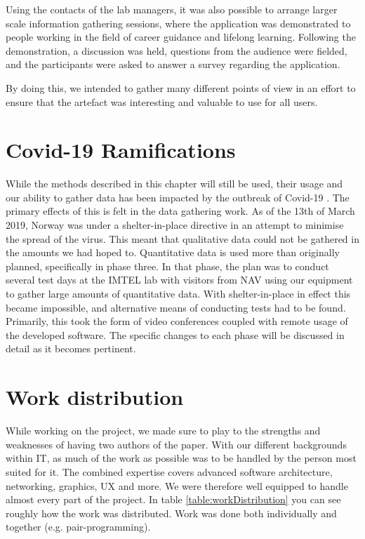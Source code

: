 Using the contacts of the lab managers, it was also possible to arrange larger scale information gathering sessions, where the application was demonstrated to people working in the field of career guidance and lifelong learning. Following the demonstration, a discussion was held, questions from the audience were fielded, and the participants were asked to answer a survey regarding the application. 

By doing this, we intended to gather many different points of view in an effort to ensure that the artefact was interesting and valuable to use for all users.

\section{Covid-19 Ramifications}
While the methods described in this chapter will still be used, their usage and our ability to gather data has been impacted by the outbreak of Covid-19 \cite{FhiCorona}. The primary effects of this is felt in the data gathering work. As of the 13th of March 2019, Norway was under a shelter-in-place directive in an attempt to minimise the spread of the virus. This meant that qualitative data could not be gathered in the amounts we had hoped to. Quantitative data is  used more than originally planned, specifically in phase three. In that phase, the plan was to conduct several test days at the IMTEL lab with visitors from NAV using our equipment to gather large amounts of quantitative data. With shelter-in-place in effect this became impossible, and alternative means of conducting tests had to be found. Primarily, this took the form of video conferences coupled with remote usage of the developed software. The specific changes to  each phase will be discussed in detail as it becomes pertinent. 


\section{Work distribution}
While working on the project, we made sure to play to the strengths and weaknesses of having two authors of the paper. With our different backgrounds within IT, as much of the work as possible was to be handled by the person most suited for it. The combined expertise covers advanced software architecture, networking, graphics, UX and more. We were therefore well equipped to handle almost every part of the project. In table \ref{table:workDistribution} you can see roughly how the work was distributed. Work was done both individually and together (e.g. pair-programming).  

